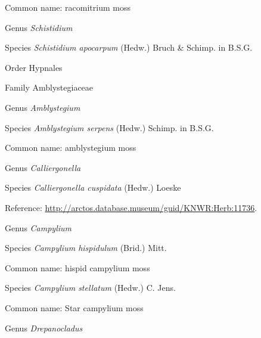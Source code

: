 \documentclass[9pt, article]{memoir}
\begin{document}
\begin{multicols}{2}
Common name: racomitrium moss

\vspace{6pt}\noindent\hspace{30pt}Genus \textit{Schistidium}


\vspace{6pt}\noindent\hspace{36pt}Species \textit{Schistidium apocarpum} (Hedw.) Bruch \& Schimp. in B.S.G.


\vspace{6pt}\noindent\hspace{18pt}Order Hypnales


\vspace{6pt}\noindent\hspace{24pt}Family Amblystegiaceae


\vspace{6pt}\noindent\hspace{30pt}Genus \textit{Amblystegium}


\vspace{6pt}\noindent\hspace{36pt}Species \textit{Amblystegium serpens} (Hedw.) Schimp. in B.S.G.


Common name: amblystegium moss

\vspace{6pt}\noindent\hspace{30pt}Genus \textit{Calliergonella}


\vspace{6pt}\noindent\hspace{36pt}Species \textit{Calliergonella cuspidata} (Hedw.) Loeske


Reference: 
\url{http://arctos.database.museum/guid/KNWR:Herb:11736}.

\vspace{6pt}\noindent\hspace{30pt}Genus \textit{Campylium}


\vspace{6pt}\noindent\hspace{36pt}Species \textit{Campylium hispidulum} (Brid.) Mitt.


Common name: hispid campylium moss

\vspace{6pt}\noindent\hspace{36pt}Species \textit{Campylium stellatum} (Hedw.) C. Jens.


Common name: Star campylium moss

\vspace{6pt}\noindent\hspace{30pt}Genus \textit{Drepanocladus}



\end{multicols}
\end{document}
